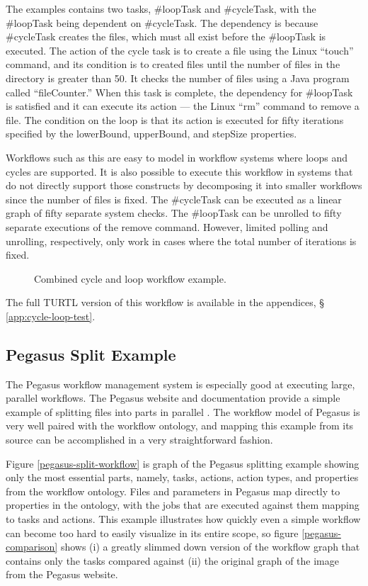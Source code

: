 The examples contains two tasks, \#loopTask and \#cycleTask, with the \#loopTask
being dependent on \#cycleTask. The dependency is because \#cycleTask
creates the files, which must all exist before the \#loopTask is executed. The
action of the cycle task is to create a file using the Linux ``touch'' command,
and its condition is to created files until the number of files in the directory
is greater than 50. It checks the number of files using a Java program called
``fileCounter.'' When this task is complete, the dependency for \#loopTask is
satisfied and it can execute its action --- the Linux ``rm'' command to remove a
file. The condition on the loop is that its action is executed for fifty
iterations specified by the lowerBound, upperBound, and stepSize properties.

Workflows such as this are easy to model in workflow systems where loops and
cycles are supported. It is also possible to execute this workflow in systems
that do not directly support those constructs by decomposing it into smaller
workflows since the number of files is fixed. The \#cycleTask can be
executed as a linear graph of fifty separate system checks. The \#loopTask can
be unrolled to fifty separate executions of the remove command. However, limited
polling and unrolling, respectively, only work in cases where the total number
of iterations is fixed.

\begin{figure}[htbp]
\centering
{}
\caption{Combined cycle and loop workflow example.}
\label{cycle-loop-test}
\end{figure}

The full TURTL version of this workflow is available in the appendices, \S
\ref{app:cycle-loop-test}.

\subsection{Pegasus Split Example}

The Pegasus workflow management system is especially good at executing large,
parallel workflows. The Pegasus website and documentation provide a simple
example of splitting files into parts in parallel
\cite{noauthor_workflow_nodate}. The workflow model of Pegasus is very well
paired with the workflow ontology, and mapping this example from its source can
be accomplished in a very straightforward fashion.

Figure \ref{pegasus-split-workflow} is graph of the Pegasus splitting example
showing only the most essential parts, namely, tasks, actions, action types, and
properties from the workflow ontology. Files and parameters in Pegasus map
directly to properties in the ontology, with the jobs that are executed against
them mapping to tasks and actions. This example illustrates how quickly even a
simple workflow can become too hard to easily visualize in its entire scope, so
figure \ref{pegasus-comparison} shows (i) a greatly slimmed down version of the
workflow graph that contains only the tasks compared against (ii) the original
graph of the image from the Pegasus website.

